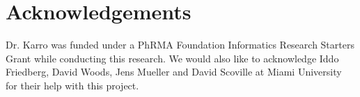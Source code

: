 \documentclass[a4,center,fleqn]{NAR}
\begin{document}
\section{Acknowledgements}

Dr. Karro was funded under a PhRMA Foundation Informatics Research
Starters Grant while conducting this research.  We would also like to
acknowledge Iddo Friedberg, David Woods, Jens Mueller and David
Scoville at Miami University for their help with this project.

\vspace{3mm}


\end{document}
